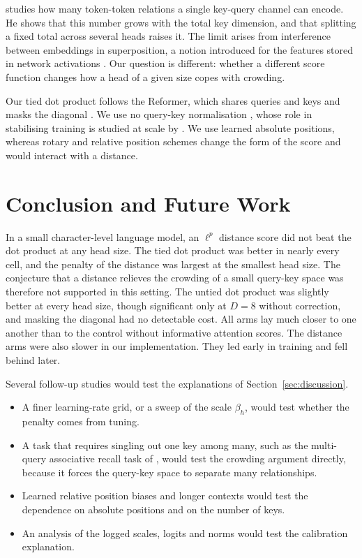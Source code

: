 \documentclass[11pt]{article}
\begin{document}
\citet{adler2026} studies how many token-token relations a single key-query channel can encode.
He shows that this number grows with the total key dimension, and that splitting a fixed total across several heads raises it.
The limit arises from interference between embeddings in superposition, a notion introduced for the features stored in network activations \citep{elhage2022}.
Our question is different: whether a different score function changes how a head of a given size copes with crowding.

Our tied dot product follows the Reformer, which shares queries and keys and masks the diagonal \citep{kitaev2020reformer}.
We use no query-key normalisation \citep{henry2020}, whose role in stabilising training is studied at scale by \citet{wortsman2024small}.
We use learned absolute positions, whereas rotary and relative position schemes \citep{shaw2018,su2021} change the form of the score and would interact with a distance.

\section{Conclusion and Future Work}

In a small character-level language model, an $\ell^p$ distance score did not beat the dot product at any head size.
The tied dot product was better in nearly every cell, and the penalty of the distance was largest at the smallest head size.
The conjecture that a distance relieves the crowding of a small query-key space was therefore not supported in this setting.
The untied dot product was slightly better at every head size, though significant only at $D=8$ without correction, and masking the diagonal had no detectable cost.
All arms lay much closer to one another than to the control without informative attention scores.
The distance arms were also slower in our implementation.
They led early in training and fell behind later.

Several follow-up studies would test the explanations of Section~\ref{sec:discussion}.
\begin{itemize}
\item A finer learning-rate grid, or a sweep of the scale $\beta_h$, would test whether the penalty comes from tuning.
\item A task that requires singling out one key among many, such as the multi-query associative recall task of \citet{arora2024zoology}, would test the crowding argument directly, because it forces the query-key space to separate many relationships.
\item Learned relative position biases and longer contexts would test the dependence on absolute positions and on the number of keys.
\item An analysis of the logged scales, logits and norms would test the calibration explanation.
\end{itemize}
\end{document}
